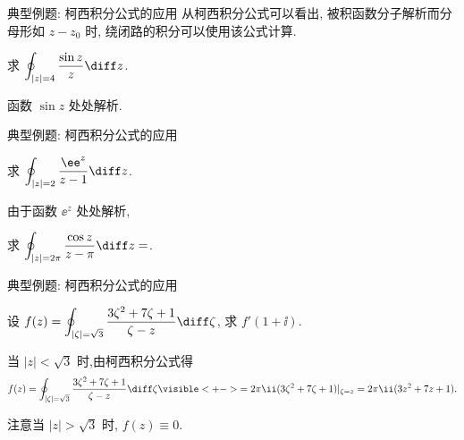 \begin{frame}{典型例题: 柯西积分公式的应用}
	\onslide<+->
	从柯西积分公式可以看出, 被积函数分子解析而分母形如 $z-z_0$ 时, 绕闭路的积分可以使用该公式计算.

	\onslide<+->
	\begin{example}
		求 $\displaystyle\oint_{|z|=4}\frac{\sin z}z\diff z$.
	\end{example}

	\onslide<+->
	\begin{solution}
		函数 $\sin z$ 处处解析.
		\vspace{-.5\baselineskip}
	\end{solution}
\end{frame}


\begin{frame}{典型例题: 柯西积分公式的应用}
	\onslide<+->
	\begin{example}
		求 $\displaystyle\oint_{|z|=2}\frac{\ee^z}{z-1}\diff z$.
	\end{example}

	\onslide<+->
	\begin{solution}
		由于函数 $\ee^z$ 处处解析,
		\vspace{-.5\baselineskip}
	\end{solution}

	\onslide<+->
	\begin{exercise}
		求 $\displaystyle\oint_{|z|=2\pi}\frac{\cos z}{z-\pi}\diff z=$\fillblankframe{$-2\pi\ii$}.
	\end{exercise}
\end{frame}


\begin{frame}{典型例题: 柯西积分公式的应用}
	\onslide<+->
	\begin{example}
		设 $f(z)=\displaystyle\oint_{|\zeta|=\sqrt3}\frac{3\zeta^2+7\zeta+1}{\zeta-z}\diff \zeta$, 求 $f'(1+\ii)$.
	\end{example}

	\onslide<+->
	\begin{solution}
		当 $|z|<\sqrt3$ 时,由柯西积分公式得
	\[
			f(z)=\oint_{|\zeta|=\sqrt3}\frac{3\zeta^2+7\zeta+1}{\zeta-z}\diff \zeta
			\visible<+->{=2\pi\ii(3\zeta^2+7\zeta+1)|_{\zeta=z}=2\pi\ii(3z^2+7z+1).}
	\]
		\onslide<+->{
			$f'(1+\ii)=2\pi\ii(13+6\ii)=-12\pi+26\pi\ii$.
		}
	\end{solution}
	\onslide<+->
	注意当 $|z|>\sqrt3$ 时, $f(z)\equiv0$.
\end{frame}


